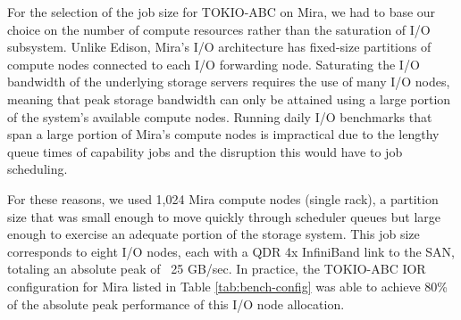 For the selection of the job size for TOKIO-ABC on Mira, we had to
base our choice on the number of compute resources rather than the saturation of
I/O subsystem.
Unlike Edison, Mira's I/O architecture has fixed-size partitions of compute nodes connected to each I/O forwarding node.
Saturating the I/O bandwidth of the underlying storage servers requires the
use of many I/O nodes, meaning that peak storage bandwidth can only be
attained using a large portion of the system's available compute nodes.
Running daily I/O benchmarks that span a large portion of Mira's compute
nodes is impractical due to the lengthy queue times of capability jobs and
the disruption this would have to job scheduling.

For these reasons, we used 1,024 Mira compute nodes (single
rack), a partition size that was small enough to move quickly through
scheduler queues but large enough to exercise an adequate portion of the
storage system.  This job size corresponds to eight I/O nodes, each with a QDR 4x InfiniBand link to the SAN, totaling an absolute peak of ~25 GB/sec.
In practice, the TOKIO-ABC IOR configuration for Mira listed in Table \ref{tab:bench-config} was able to achieve 80\% of the absolute peak performance of this I/O node allocation.
